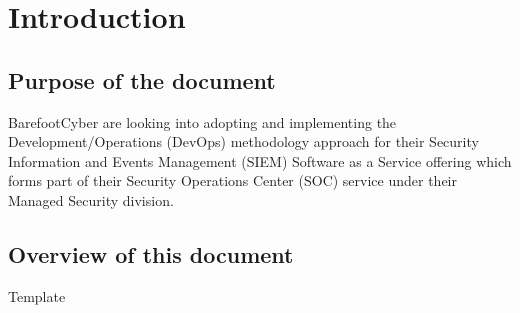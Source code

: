 \documentclass[12pt]{article}
\begin{document}

\section{Introduction}
   \subsection{Purpose of the document}
   \par BarefootCyber are looking into adopting and implementing the Development/Operations (DevOps) methodology approach for their Security Information and Events Management (SIEM) Software as a Service offering which forms part of their Security Operations Center (SOC) service under their Managed Security division.
   
   \subsection{Overview of this document}
   \par Template \citep{bibtex}

\newpage


\end{document}
